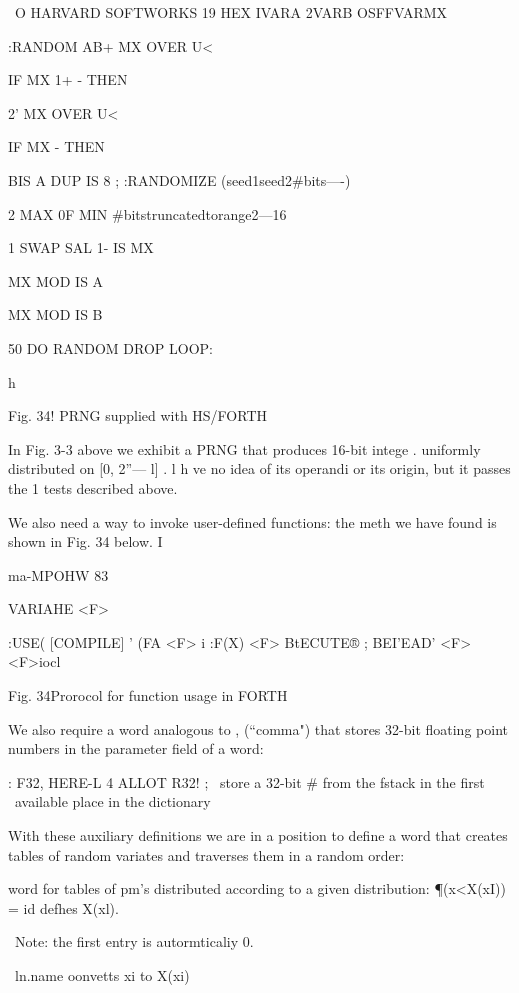  

 

\ O HARVARD SOFTWORKS 19%
HEX
IVARA 2VARB OSFFVARMX

:RANDOM AB+ MX OVER U<

IF MX 1+ - THEN

2' MX OVER U<

IF MX - THEN

BIS A DUP IS 8 ;
:RANDOMIZE (seed1seed2#bits—-)

2 MAX 0F MIN \#bitstruncatedtorange2—16

1 SWAP SAL 1- IS MX

MX MOD IS A

MX MOD IS B

50 DO RANDOM DROP LOOP:

 

h

Fig. 34! PRNG supplied with HS/FORTH

In Fig. 3-3 above we exhibit a PRNG that produces 16-bit intege .
uniformly distributed on [0, 2”— l] . l h ve no idea of its
operandi or its origin, but it passes the 1 tests described above.

We also need a way to invoke user-deﬁned functions: the meth
we have found is shown in Fig. 34 below. I

ma-MPOHW 83

 

VARIAHE <F>

:USE( [COMPILE] ' (FA <F> i
:F(X) <F> BtECUTE® ;
BEI'EAD' <F> \rrllto<F>iocl

 

 

 

Fig. 34Prorocol for function usage in FORTH

We also require a word analogous to , (“comma") that stores
32-bit floating point numbers in the parameter ﬁeld of a word:

: F32, HERE-L 4 ALLOT R32! ;
\ store a 32-bit # from the fstack in the ﬁrst
\ available place in the dictionary

With these auxiliary deﬁnitions we are in a position to deﬁne a
word that creates tables of random variates and traverses them in
a random order:

\Ddinlng word for tables of pm's distributed according to a given distribution:
\P(x<X(xI)) = id defhes X(xl).

\ Note: the first entry is autormticaliy 0.

\ ln.name oonvetts xi to X(xi)

